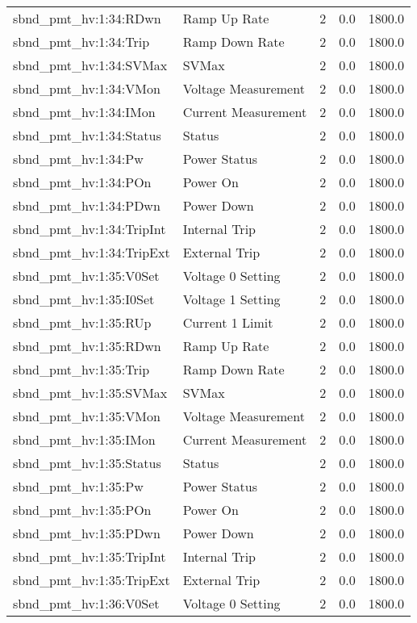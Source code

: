 \begin{center}
\begin{longtable}{l | l l l l }
sbnd\_pmt\_hv:1:34:RDwn & Ramp Up Rate & 2 & 0.0 & 1800.0\\ 
sbnd\_pmt\_hv:1:34:Trip & Ramp Down Rate & 2 & 0.0 & 1800.0\\ 
sbnd\_pmt\_hv:1:34:SVMax & SVMax & 2 & 0.0 & 1800.0\\ 
sbnd\_pmt\_hv:1:34:VMon & Voltage Measurement & 2 & 0.0 & 1800.0\\ 
sbnd\_pmt\_hv:1:34:IMon & Current Measurement & 2 & 0.0 & 1800.0\\ 
sbnd\_pmt\_hv:1:34:Status & Status & 2 & 0.0 & 1800.0\\ 
sbnd\_pmt\_hv:1:34:Pw & Power Status & 2 & 0.0 & 1800.0\\ 
sbnd\_pmt\_hv:1:34:POn & Power On & 2 & 0.0 & 1800.0\\ 
sbnd\_pmt\_hv:1:34:PDwn & Power Down & 2 & 0.0 & 1800.0\\ 
sbnd\_pmt\_hv:1:34:TripInt & Internal Trip & 2 & 0.0 & 1800.0\\ 
sbnd\_pmt\_hv:1:34:TripExt & External Trip & 2 & 0.0 & 1800.0\\ 
sbnd\_pmt\_hv:1:35:V0Set & Voltage 0 Setting & 2 & 0.0 & 1800.0\\ 
sbnd\_pmt\_hv:1:35:I0Set & Voltage 1 Setting & 2 & 0.0 & 1800.0\\ 
sbnd\_pmt\_hv:1:35:RUp & Current 1 Limit & 2 & 0.0 & 1800.0\\ 
sbnd\_pmt\_hv:1:35:RDwn & Ramp Up Rate & 2 & 0.0 & 1800.0\\ 
sbnd\_pmt\_hv:1:35:Trip & Ramp Down Rate & 2 & 0.0 & 1800.0\\ 
sbnd\_pmt\_hv:1:35:SVMax & SVMax & 2 & 0.0 & 1800.0\\ 
sbnd\_pmt\_hv:1:35:VMon & Voltage Measurement & 2 & 0.0 & 1800.0\\ 
sbnd\_pmt\_hv:1:35:IMon & Current Measurement & 2 & 0.0 & 1800.0\\ 
sbnd\_pmt\_hv:1:35:Status & Status & 2 & 0.0 & 1800.0\\ 
sbnd\_pmt\_hv:1:35:Pw & Power Status & 2 & 0.0 & 1800.0\\ 
sbnd\_pmt\_hv:1:35:POn & Power On & 2 & 0.0 & 1800.0\\ 
sbnd\_pmt\_hv:1:35:PDwn & Power Down & 2 & 0.0 & 1800.0\\ 
sbnd\_pmt\_hv:1:35:TripInt & Internal Trip & 2 & 0.0 & 1800.0\\ 
sbnd\_pmt\_hv:1:35:TripExt & External Trip & 2 & 0.0 & 1800.0\\ 
sbnd\_pmt\_hv:1:36:V0Set & Voltage 0 Setting & 2 & 0.0 & 1800.0\\ 

\end{longtable}
\end{center}
